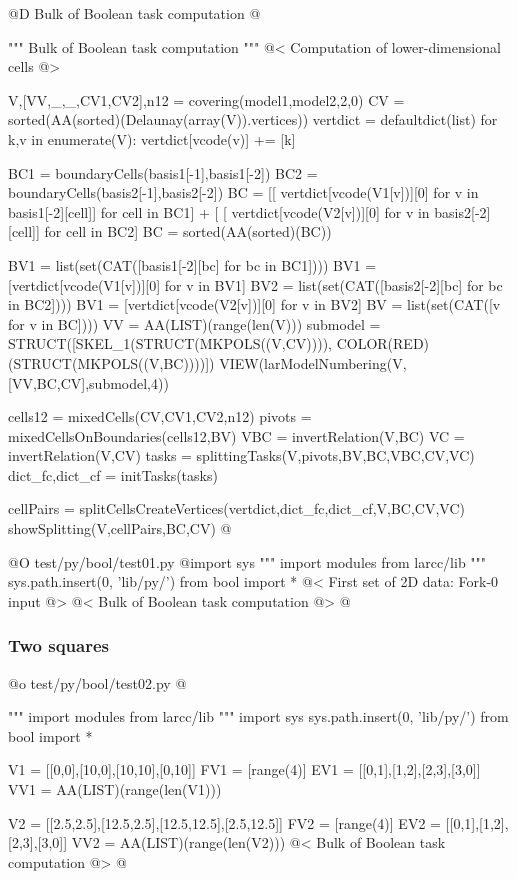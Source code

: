 \documentclass[11pt,oneside]{article}	%
\begin{document}
@D Bulk of Boolean task computation
@{""" Bulk of Boolean task computation """
@< Computation of lower-dimensional cells @>

V,[VV,_,_,CV1,CV2],n12 = covering(model1,model2,2,0)
CV = sorted(AA(sorted)(Delaunay(array(V)).vertices))
vertdict = defaultdict(list)
for k,v in enumerate(V): vertdict[vcode(v)] += [k]

BC1 = boundaryCells(basis1[-1],basis1[-2])
BC2 = boundaryCells(basis2[-1],basis2[-2])
BC = [[ vertdict[vcode(V1[v])][0] for v in basis1[-2][cell]] for cell in BC1] + [ [ vertdict[vcode(V2[v])][0] for v in basis2[-2][cell]] for cell in BC2]
BC = sorted(AA(sorted)(BC))

BV1 = list(set(CAT([basis1[-2][bc] for bc in BC1])))
BV1 = [vertdict[vcode(V1[v])][0] for v in BV1]
BV2 = list(set(CAT([basis2[-2][bc] for bc in BC2])))
BV1 = [vertdict[vcode(V2[v])][0] for v in BV2]
BV = list(set(CAT([v for v in BC])))
VV = AA(LIST)(range(len(V)))
submodel = STRUCT([SKEL_1(STRUCT(MKPOLS((V,CV)))), COLOR(RED)(STRUCT(MKPOLS((V,BC))))])
VIEW(larModelNumbering(V,[VV,BC,CV],submodel,4))

cells12 = mixedCells(CV,CV1,CV2,n12)
pivots = mixedCellsOnBoundaries(cells12,BV)
VBC = invertRelation(V,BC)
VC = invertRelation(V,CV)
tasks = splittingTasks(V,pivots,BV,BC,VBC,CV,VC)
dict_fc,dict_cf = initTasks(tasks)

cellPairs = splitCellsCreateVertices(vertdict,dict_fc,dict_cf,V,BC,CV,VC)
showSplitting(V,cellPairs,BC,CV)
@}


@O test/py/bool/test01.py
@{import sys
""" import modules from larcc/lib """
sys.path.insert(0, 'lib/py/')
from bool import *
@< First set of 2D data: Fork-0 input @>
@< Bulk of Boolean task computation @>
@}


\subsubsection{Two squares}




@o test/py/bool/test02.py
@{""" import modules from larcc/lib """
import sys
sys.path.insert(0, 'lib/py/')
from bool import *

V1 = [[0,0],[10,0],[10,10],[0,10]]
FV1 = [range(4)]
EV1 = [[0,1],[1,2],[2,3],[3,0]]
VV1 = AA(LIST)(range(len(V1)))

V2 = [[2.5,2.5],[12.5,2.5],[12.5,12.5],[2.5,12.5]]
FV2 = [range(4)]
EV2 = [[0,1],[1,2],[2,3],[3,0]]
VV2 = AA(LIST)(range(len(V2)))
@< Bulk of Boolean task computation @>
@}
\end{document}
